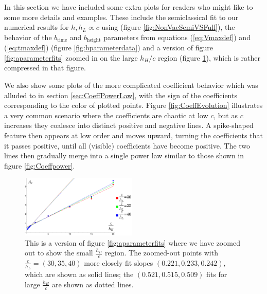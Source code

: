 \documentclass[12pt]{article}
\numberwithin{equation}{section}
\begin{document}
In this section we have included some extra plots for readers who might like to some more details and examples.  These include  the semiclassical fit to our numerical results for $h, h_L \propto c$ using \cite{Fitzpatrick:2016mjq} (figure \ref{fig:NonVacSemiVSFull}), the behavior of the $b_\text{time}$ and $b_\text{height}$ parameters from equations (\ref{eq:Vmaxdef}) and (\ref{eq:tmaxdef}) (figure \ref{fig:bparameterdata}) and a version of figure \ref{fig:aparameterfits} zoomed in on the large $h_H/c$ region (figure \ref{fig:at_large_hh}), which is rather compressed in that figure.

We also show some plots of the more complicated coefficient behavior which was 
alluded to in section \ref{sec:CoeffPowerLaw}, with the sign of the coefficients corresponding to the color of plotted points. Figure \ref{fig:CoeffEvolution} illustrates a very common scenario where the coefficients are chaotic at low $c$, but as $c$ increases they coalesce into distinct positive and negative lines. A  spike-shaped feature then appears at low order and moves upward, turning the coefficients that it passes positive, until all (visible) coefficients have become positive. The two lines then gradually merge into a single power law similar to those shown in figure \ref{fig:Coeffpower}.

\begin{figure}[h]
\begin{centering}
\includegraphics[width=0.49\textwidth]{at_small_hh}
	\caption{ This is a version of figure \ref{fig:aparameterfits} where we have zoomed out to show the small $\frac{h_H}{c}$ region. The zoomed-out points with $\frac{c}{h_L} = (30, 35, 40)$ more closely fit slopes $(0.221, 0.233, 0.242)$, which are shown as solid lines; the $(0.521, 0.515, 0.509)$ fits for large $\frac{h_H}{c}$ are shown as dotted lines.  }
\label{fig:at_large_hh}
\end{centering}
\end{figure}
\end{document}
